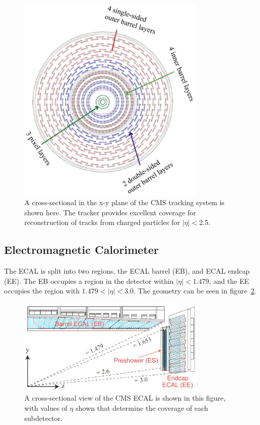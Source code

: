 \begin{figure}[!htb]
\begin{center}
\includegraphics[width=0.8\textwidth]{cms/figs/Barrel.pdf}
\caption{
  A cross-sectional in the x-y plane of the CMS tracking system is shown here.
  The tracker provides excellent coverage for reconstruction of tracks from charged particles for $|\eta| < $2.5.
\label{fig:tracker}
}
\end{center}
\end{figure}

\subsection{Electromagnetic Calorimeter}
\label {subs:ECAL}
The ECAL is split into two regions, the ECAL barrel (EB), and ECAL endcap (EE).
The EB occupies a region in the detector within $|\eta| < 1.479$, and the EE occupies the region with $1.479 < |\eta| < 3.0$.
The geometry can be seen in figure~\ref{fig:ecal_eta}.

\begin{figure}[!htb]
\begin{center}
\includegraphics[width=0.8\textwidth]{cms/figs/Figures_Experimental_Apparatus_ECALRapidity.pdf}
\caption{ A cross-sectional view of the CMS ECAL is shown in this figure, with values of $\eta$ shown that determine the coverage of each subdetector.
\label{fig:ecal_eta}
}
\end{center}
\end{figure}

